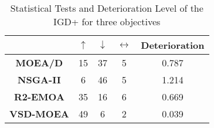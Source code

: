 \begin{table}[t]
\centering
\caption{Statistical Tests and Deterioration Level of the IGD+ for three objectives}
\label{tab:Tests_IGDP_3obj}
\begin{tabular}{c c|c|c|c}
\cline{2-5}
                                        & \textbf{$\uparrow$} & \textbf{$\downarrow$} & \textbf{$\leftrightarrow$} & \textbf{Deterioration} \\ \hline
\multicolumn{1}{c|}{\textbf{MOEA/D}}   & 15                  & 37                    & 5                          & 0.787         \\ \hline
\multicolumn{1}{c|}{\textbf{NSGA-II}}  & 6                   & 46                    & 5                          & 1.214         \\ \hline
\multicolumn{1}{c|}{\textbf{R2-EMOA}}  & 35                  & 16                    & 6                          & 0.669         \\ \hline
\multicolumn{1}{c|}{\textbf{VSD-MOEA}} & 49                  & 6                     & 2                          & 0.039         \\ \hline
\end{tabular}%
\end{table}

